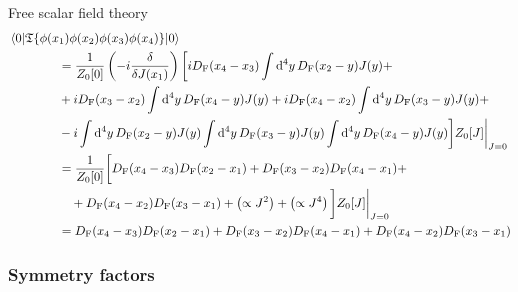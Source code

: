 \begin{example}{Free scalar field theory}{}
  \begin{equation*}
    \begin{split}
      & \braket{0 | \mathfrak{T}\{\phi(x_1) \phi(x_2) \phi(x_3) \phi(x_4)\} | 0} \\
      & \qquad \qquad = \frac{1}{Z_0[0]} \left( -i \frac{\delta}{\delta J(x_1)} \right) \bigg[ i D_\text{F}(x_4 - x_3) \int \mathrm{d}^4y\, D_\text{F}(x_2 - y) J(y) + \\
      & \qquad \qquad + i D_\text{F}(x_3 - x_2) \int \mathrm{d}^4y\, D_\text{F}(x_4 - y) J(y) + i D_\text{F}(x_4 - x_2) \int \mathrm{d}^4y\, D_\text{F}(x_3 - y) J(y) + \\
      & \qquad \qquad - i \int \mathrm{d}^4y\, D_\text{F}(x_2 - y) J(y) \int \mathrm{d}^4y\, D_\text{F}(x_3 - y) J(y) \int \mathrm{d}^4y\, D_\text{F}(x_4 - y) J(y) \bigg] Z_0[J] \bigg\vert_{J = 0} \\
      & \qquad \qquad = \frac{1}{Z_0[0]} \bigg[ D_\text{F}(x_4 - x_3) D_\text{F}(x_2 - x_1) + D_\text{F}(x_3 - x_2) D_\text{F}(x_4 - x_1) + \\
      & \qquad \qquad \quad + D_\text{F}(x_4 - x_2) D_\text{F}(x_3 - x_1) + \left( \propto J^2 \right) + \left( \propto J^4 \right) \bigg] Z_0[J] \bigg\vert_{J = 0} \\
      & \qquad \qquad = D_\text{F}(x_4 - x_3) D_\text{F}(x_2 - x_1) + D_\text{F}(x_3 - x_2) D_\text{F}(x_4 - x_1) + D_\text{F}(x_4 - x_2) D_\text{F}(x_3 - x_1)
    \end{split}
  \end{equation*}
\end{example}

\subsubsection{Symmetry factors}
\label{sssec:sym-fact}

